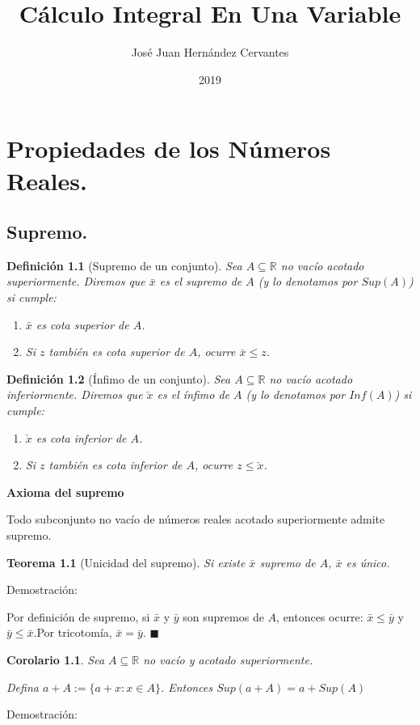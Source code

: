 \documentclass[12pt]{book}
\title{Cálculo Integral En Una Variable}
\author{José Juan Hernández Cervantes}
\date{2019}
\newcommand\R{{\mathbb R}}
\newtheorem{teo}{Teorema}[section]
\newtheorem{defi}{Definición}[section]
\newtheorem{coro}{Corolario}[section]
\begin{document}
\maketitle
\tableofcontents
\chapter{Propiedades de los Números Reales.}
\section{Supremo.}
\begin{defi}[Supremo de un conjunto]\rm
Sea $A \subseteq \R$  no vacío acotado superiormente.
Diremos que $\bar{x}$ es el supremo de $A$ (y lo denotamos por $Sup(A)$) si cumple:
\begin{enumerate}
\item $\bar{x}$ es cota superior de $A$.
\item Si $z$ también es cota superior de $A$, ocurre $\bar{x} \le z$.
\end{enumerate}
\end{defi}
\begin{defi}[Ínfimo de un conjunto]\rm
Sea $A \subseteq \R$  no vacío acotado inferiormente.
Diremos que $\check{x}$ es el ínfimo de $A$ (y lo denotamos por $Inf(A)$) si cumple:
\begin{enumerate}
\item $\check{x}$ es cota inferior de $A$.
\item Si $z$ también es cota inferior de $A$, ocurre $z \le \check{x}$.
\end{enumerate}
\end{defi}
\textbf{Axioma del supremo}

Todo subconjunto no vacío de números reales acotado superiormente admite supremo.
\begin{teo}[Unicidad del supremo]\rm
Si existe $\bar{x}$ supremo de $A$, $\bar{x}$ es único.
\end{teo}

Demostración:

Por definición de supremo, si $\bar{x}$ y $\bar{y}$ son supremos de $A$, entonces ocurre:
$\bar{x}\le\bar{y}$ y $\bar{y}\le\bar{x}$.Por tricotomía, $\bar{x}=\bar{y}$. $\blacksquare$
\begin{coro}\rm
Sea $A\subseteq{\R}$ no vacío y acotado superiormente.

Defina $a+A:=\{a+x : x \in A \}$. Entonces $Sup(a+A)=a+Sup(A)$
\end{coro}
Demostración:
\end{document}
